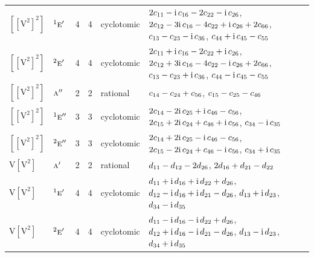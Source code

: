 \documentclass[10pt,a4paper]{article}
\numberwithin{equation}{section}
\newcommand{\irr}[1]{\text{\normalfont\scshape #1}}
\newcommand{\conjpair}[1]{{}^{#1}}
\newcommand{\iunit}{\mathrm{i}}
\newcommand{\jahn}[1]{\mathrm{#1}}
\newlength{\fillwidth}\newlength{\cellwidth}\newlength{\colwidth}
\newcommand{\signbreak}{\penalty100\relax}
\begin{document}
{\begin{longtable}{@{}llrrl>{\RaggedRight\arraybackslash}p{\fillwidth}@{}}
$\jahn{[[V^{2}]^{2}]}$ & $\conjpair{1}\irr{e}'$ & 4 & 4 & cyclotomic & $2c_{11} -\signbreak \iunit{}\,c_{16} -\signbreak 2c_{22} -\signbreak \iunit{}\,c_{26}$, $2c_{12} -\signbreak 3\iunit{}\,c_{16} -\signbreak 4c_{22} +\signbreak \iunit{}\,c_{26} +\signbreak 2c_{66}$, $c_{13} -\signbreak c_{23} -\signbreak \iunit{}\,c_{36}$, $c_{44} +\signbreak \iunit{}\,c_{45} -\signbreak c_{55}$\\
$\jahn{[[V^{2}]^{2}]}$ & $\conjpair{2}\irr{e}'$ & 4 & 4 & cyclotomic & $2c_{11} +\signbreak \iunit{}\,c_{16} -\signbreak 2c_{22} +\signbreak \iunit{}\,c_{26}$, $2c_{12} +\signbreak 3\iunit{}\,c_{16} -\signbreak 4c_{22} -\signbreak \iunit{}\,c_{26} +\signbreak 2c_{66}$, $c_{13} -\signbreak c_{23} +\signbreak \iunit{}\,c_{36}$, $c_{44} -\signbreak \iunit{}\,c_{45} -\signbreak c_{55}$\\
$\jahn{[[V^{2}]^{2}]}$ & $\irr{a}''$ & 2 & 2 & rational & $c_{14} -\signbreak c_{24} +\signbreak c_{56}$, $c_{15} -\signbreak c_{25} -\signbreak c_{46}$\\
$\jahn{[[V^{2}]^{2}]}$ & $\conjpair{1}\irr{e}''$ & 3 & 3 & cyclotomic & $2c_{14} -\signbreak 2\iunit{}\,c_{25} +\signbreak \iunit{}\,c_{46} -\signbreak c_{56}$, $2c_{15} +\signbreak 2\iunit{}\,c_{24} +\signbreak c_{46} +\signbreak \iunit{}\,c_{56}$, $c_{34} -\signbreak \iunit{}\,c_{35}$\\
$\jahn{[[V^{2}]^{2}]}$ & $\conjpair{2}\irr{e}''$ & 3 & 3 & cyclotomic & $2c_{14} +\signbreak 2\iunit{}\,c_{25} -\signbreak \iunit{}\,c_{46} -\signbreak c_{56}$, $2c_{15} -\signbreak 2\iunit{}\,c_{24} +\signbreak c_{46} -\signbreak \iunit{}\,c_{56}$, $c_{34} +\signbreak \iunit{}\,c_{35}$\\
$\jahn{V[V^{2}]}$ & $\irr{a}'$ & 2 & 2 & rational & $d_{11} -\signbreak d_{12} -\signbreak 2d_{26}$, $2d_{16} +\signbreak d_{21} -\signbreak d_{22}$\\
$\jahn{V[V^{2}]}$ & $\conjpair{1}\irr{e}'$ & 4 & 4 & cyclotomic & $d_{11} +\signbreak \iunit{}\,d_{16} +\signbreak \iunit{}\,d_{22} +\signbreak d_{26}$, $d_{12} -\signbreak \iunit{}\,d_{16} +\signbreak \iunit{}\,d_{21} -\signbreak d_{26}$, $d_{13} +\signbreak \iunit{}\,d_{23}$, $d_{34} -\signbreak \iunit{}\,d_{35}$\\
$\jahn{V[V^{2}]}$ & $\conjpair{2}\irr{e}'$ & 4 & 4 & cyclotomic & $d_{11} -\signbreak \iunit{}\,d_{16} -\signbreak \iunit{}\,d_{22} +\signbreak d_{26}$, $d_{12} +\signbreak \iunit{}\,d_{16} -\signbreak \iunit{}\,d_{21} -\signbreak d_{26}$, $d_{13} -\signbreak \iunit{}\,d_{23}$, $d_{34} +\signbreak \iunit{}\,d_{35}$\\

\end{longtable}}
\end{document}
